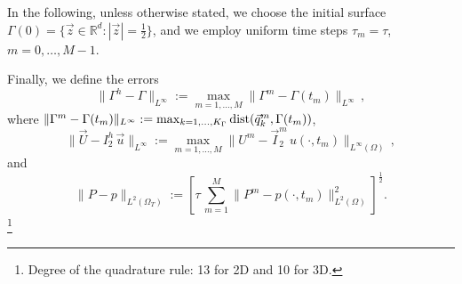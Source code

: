 \documentclass[a4paper,12pt,onecolumn]{article}
\newcommand{\R}{{\mathbb R}}
\newcommand{\errorXx}{\|\Gamma^h - \Gamma\|_{L^\infty}}
\newcommand{\errorUu}[1]{\|\vec U - I^h_{#1}\,\vec u\|_{L^\infty}}
\newcommand{\LerrorPp}{\|P - p\|_{L^2(\Omega_T)}}
\begin{document}
In the following, unless otherwise stated, we choose the initial surface 
$\Gamma(0) = \{ \vec z \in \R^d : |\vec z| = \frac12 \}$, and we employ 
uniform time steps $\tau_m=\tau$, $m=0,\ldots, M-1$.

Finally, we define the errors 
\begin{equation} \label{eq:errorXx}
\errorXx := \max_{m=1,\ldots, M} \|\Gamma^m - \Gamma(t_m)\|_{L^\infty}\,, 
\end{equation}
where $\|\Gamma^m - \Gamma(t_m)\|_{L^\infty} := 
\max_{k=1,\ldots, K_\Gamma} {\rm dist}( \vec{q}^m_k, \Gamma(t_m))$,
\begin{equation*} 
\errorUu2 := \max_{m=1,\ldots, M}\|U^m 
- \vec I^m_2\,u(\cdot,t_m)\|_{L^\infty(\Omega)}\,, 
\end{equation*}
and
\begin{equation*}
\LerrorPp := \left[\tau\,\sum_{m=1}^M \|P^m - p(\cdot,t_m)\|_{L^2(\Omega)}^2 
\right]^\frac12 .
\end{equation*}
\footnote{Degree of the quadrature rule: 13 for 2D and 10 for 3D.}
\end{document}
